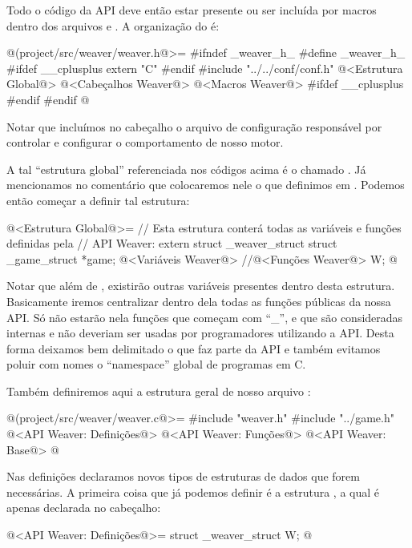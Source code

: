 Todo o código da API deve então estar presente ou ser incluída por
macros dentro dos arquivos 
e . A organização do  é:

\iniciocodigo
@(project/src/weaver/weaver.h@>=
#ifndef _weaver_h_
#define _weaver_h_
#ifdef __cplusplus
  extern "C" {
#endif
#include "../../conf/conf.h"
@<Estrutura Global@>
@<Cabeçalhos Weaver@>
@<Macros Weaver@>
#ifdef __cplusplus
  }
#endif
#endif
@
\fimcodigo

Notar que incluímos no cabeçalho o arquivo de
configuração  responsável por controlar e
configurar o comportamento de nosso motor.


A tal ``estrutura global'' referenciada nos códigos acima é
o  chamado . Já mencionamos no
comentário que colocaremos nele
o  que definimos
em . Podemos então começar a definir tal estrutura:

\iniciocodigo
@<Estrutura Global@>=
// Esta estrutura conterá todas as variáveis e funções definidas pela
// API Weaver:
extern struct _weaver_struct{
  struct _game_struct *game;
  @<Variáveis Weaver@>
  //@<Funções Weaver@>
} W;
@
\fimcodigo

Notar que além de , existirão outras variáveis
presentes dentro desta estrutura. Basicamente iremos centralizar
dentro dela todas as funções públicas da nossa API. Só não estarão
nela funções que começam com ``\_'', e que são consideradas internas e
não deveriam ser usadas por programadores utilizando a API. Desta
forma deixamos bem delimitado o que faz parte da API e também evitamos
poluir com nomes o ``namespace'' global de programas em C.

Também definiremos aqui a estrutura geral de nosso
arquivo :

\iniciocodigo
@(project/src/weaver/weaver.c@>=
#include "weaver.h"
#include "../game.h"
@<API Weaver: Definições@>
@<API Weaver: Funções@>
@<API Weaver: Base@>
@
\fimcodigo

Nas definições declaramos novos tipos de estruturas de dados que forem
necessárias. A primeira coisa que já podemos definir é a
estrutura , a qual é apenas declarada no cabeçalho:

\iniciocodigo
@<API Weaver: Definições@>=
struct _weaver_struct W;
@
\fimcodigo

